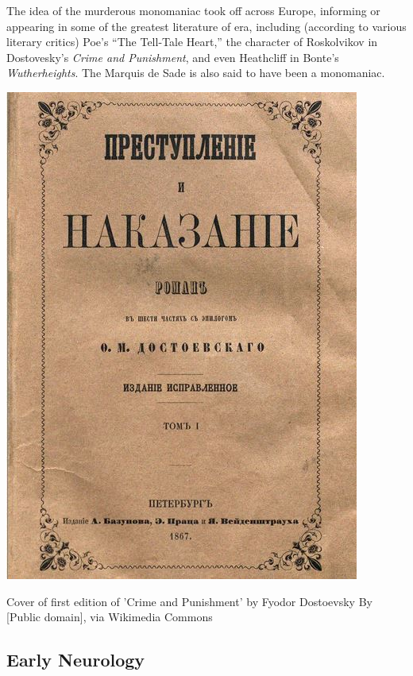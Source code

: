 \begin{refsection}
The idea of the murderous monomaniac took off across Europe, informing or appearing in some of the greatest literature of era, including (according to various literary critics) Poe's ``The Tell-Tale Heart,'' the character of Roskolvikov in Dostovesky's \emph{Crime and Punishment}, and even Heathcliff in Bonte's \emph{Wutherheights}. The Marquis de Sade is also said to have been a monomaniac.
\begin{marginfigure}
 \begin{center}

     \includegraphics[scale=0.25]{../images/crimenandpunishment.jpg}
\end{center}
 \caption{Cover of first edition of 'Crime and Punishment' by Fyodor Dostoevsky By [Public domain], via Wikimedia Commons }
\label{fig: crimeandpunishment}
\end{marginfigure}
 

\subsection{Early Neurology}
\label{earlyneurology}


\end{refsection}
